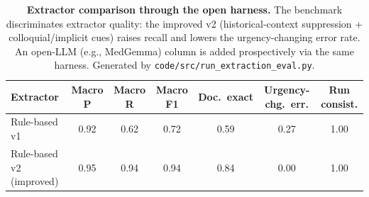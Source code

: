 \begin{table}[htbp]
\centering
\caption{\textbf{Extractor comparison through the open harness.} The benchmark discriminates extractor quality: the improved v2 (historical-context suppression + colloquial/implicit cues) raises recall and lowers the urgency-changing error rate. An open-LLM (e.g., MedGemma) column is added prospectively via the same harness. Generated by \texttt{code/src/run\_extraction\_eval.py}.}
\label{tab:extraction_compare}
\small
\begin{tabular}{lcccccc}
\toprule
Extractor & Macro P & Macro R & Macro F1 & Doc.\ exact & Urgency-chg.\ err. & Run consist. \\
\midrule
Rule-based v1 & 0.92 & 0.62 & 0.72 & 0.59 & 0.27 & 1.00 \\
Rule-based v2 (improved) & 0.95 & 0.94 & 0.94 & 0.84 & 0.00 & 1.00 \\
\bottomrule
\end{tabular}
\end{table}

